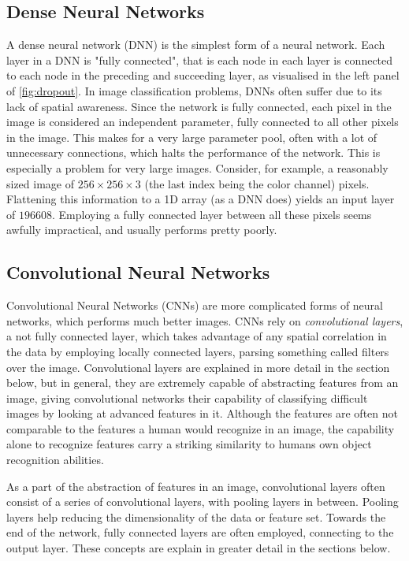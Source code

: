 \documentclass[10pt, twocolumn]{article}
\begin{document}
\subsection{Dense Neural Networks}
A dense neural network (DNN) is the simplest form of a neural network. Each layer in a DNN is "fully connected", that is each node in each layer is connected to each node in the preceding and succeeding layer, as visualised in the left panel of \cref{fig:dropout}. In image classification problems, DNNs often suffer due to its lack of spatial awareness. Since the network is fully connected, each pixel in the image is considered an independent parameter, fully connected to all other pixels in the image. This makes for a very large parameter pool, often with a lot of unnecessary connections, which halts the performance of the network. This is especially a problem for very large images. Consider, for example, a reasonably sized image of $256\times256\times3$ (the last index being the color channel) pixels. Flattening this information to a 1D array (as a DNN does) yields an input layer of $196608$. Employing a fully connected layer between all these pixels seems awfully impractical, and usually performs pretty poorly. 


\subsection{Convolutional Neural Networks}
Convolutional Neural Networks (CNNs) are more complicated forms of neural networks, which performs much better images. CNNs rely on \textit{convolutional layers}, a not fully connected layer, which takes advantage of any spatial correlation in the data by employing locally connected layers, parsing something called filters over the image. Convolutional layers are explained in more detail in the section below, but in general, they are extremely capable of abstracting features from an image, giving convolutional networks their capability of classifying difficult images by looking at advanced features in it. Although the features are often not comparable to the features a human would recognize in an image, the capability alone to recognize features carry a striking similarity to humans own object recognition abilities.

As a part of the abstraction of features in an image, convolutional layers often consist of a series of convolutional layers, with pooling layers in between. Pooling layers help reducing the dimensionality of the data or feature set. Towards the end of the network, fully connected layers are often employed, connecting to the output layer. These concepts are explain in greater detail in the sections below.
\end{document}
